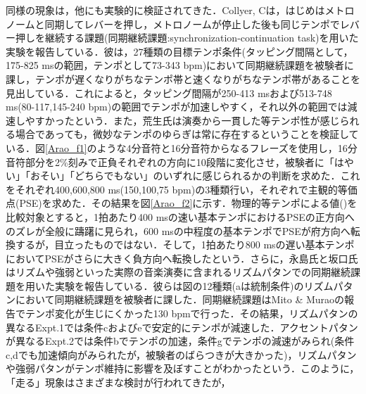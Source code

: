 \documentclass[twocolumn,10pt]{jarticle}
\begin{document}
同様の現象は，他にも実験的に検証されてきた．Collyer, C\cite{Collyer}は，はじめはメトロノームと同期してレバーを押し，メトロノームが停止した後も同じテンポでレバー押しを継続する課題(同期継続課題:synchronization-continuation task)を用いた実験を報告している．彼は，27種類の目標テンポ条件(タッピング間隔として，175-825 msの範囲，テンポとして73-343 bpm)において同期継続課題を被験者に課し，テンポが遅くなりがちなテンポ帯と速くなりがちなテンポ帯があることを見出している．これによると，タッピング間隔が250-413 msおよび513-748 ms(80-117,145-240 bpm)の範囲でテンポが加速しやすく，それ以外の範囲では減速しやすかったという．また，荒生氏\cite{Arao}は演奏から一貫した等テンポ性が感じられる場合であっても，微妙なテンポのゆらぎは常に存在するということを検証している．図\ref{Arao_f1}のような4分音符と16分音符からなるフレーズを使用し，16分音符部分を2\%刻みで正負それぞれの方向に10段階に変化させ，被験者に「はやい」「おそい」「どちらでもない」のいずれに感じられるかの判断を求めた．これをそれぞれ400,600,800 ms(150,100,75 bpm)の3種類行い，それぞれで主観的等価点(PSE)を求めた．その結果を図\ref{Arao_f2}に示す．物理的等テンポによる値()を比較対象とすると，1拍あたり400 msの速い基本テンポにおけるPSEの正方向へのズレが全般に躊躇に見られ，600 msの中程度の基本テンポでPSEが府方向へ転換するが，目立ったものではない．そして，1拍あたり800 msの遅い基本テンポにおいてPSEがさらに大きく負方向へ転換したという．さらに，永島氏と坂口氏\cite{Nagasima}はリズムや強弱といった実際の音楽演奏に含まれるリズムパタンでの同期継続課題を用いた実験を報告している．彼らは図\label{Nagasima}の12種類(aは統制条件)のリズムパタンにおいて同期継続課題を被験者に課した．同期継続課題はMito \& Murao\cite{Mito}の報告でテンポ変化が生じにくかった130 bpmで行った．その結果，リズムパタンの異なるExpt.1では条件cおよびeで安定的にテンポが減速した．アクセントパタンが異なるExpt.2では条件bでテンポの加速，条件gでテンポの減速がみられ(条件c,dでも加速傾向がみられたが，被験者のばらつきが大きかった)，リズムパタンや強弱パタンがテンポ維持に影響を及ぼすことがわかったという．このように，「走る」現象はさまざまな検討が行われてきたが，
\end{document}
